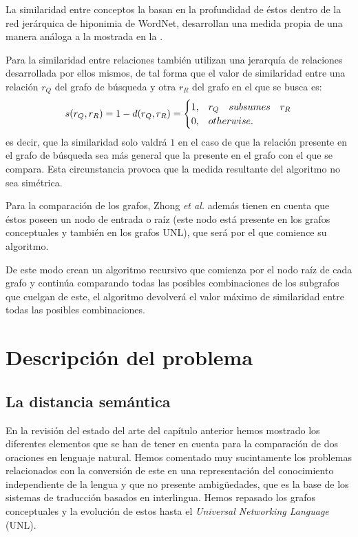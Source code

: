\documentclass[a4paper,12pt,spanish]{book}
\begin{document}
La similaridad entre conceptos la basan en la profundidad de éstos dentro de la red jerárquica
de hiponimia de WordNet, desarrollan una medida propia de una manera análoga a la mostrada en la
{\hyperref[1.state-of-the-art/ii.medidas-distancia:redes-conceptos-estructura]{\emph{}}}.

Para la similaridad entre relaciones también utilizan una jerarquía de relaciones desarrollada
por ellos mismos, de tal forma que el valor de similaridad entre una relación \(r_Q\) del
grafo de búsqueda y otra \(r_R\) del grafo en el que se busca es:
\begin{gather}
\begin{split}s(r_Q, r_R) = 1 - d(r_Q, r_R) = \begin{cases}
1, & r_Q \quad subsumes \quad r_R\\
0, & otherwise.
\end{cases}\end{split}\notag
\end{gather}
es decir, que la similaridad solo valdrá \(1\) en el caso de que la relación presente en el
grafo de búsqueda sea más general que la presente en el grafo con el que se compara. Esta
circunstancia provoca que la medida resultante del algoritmo no sea simétrica.

Para la comparación de los grafos, Zhong \emph{et al.} además tienen en cuenta que éstos poseen un
nodo de entrada o raíz (este nodo está presente en los grafos conceptuales y también en
los grafos UNL), que será por el que comience su algoritmo.

De este modo crean un algoritmo recursivo que comienza por el nodo raíz de cada grafo y
continúa comparando todas las posibles combinaciones de los subgrafos que cuelgan de este, el
algoritmo devolverá el valor máximo de similaridad entre todas las posibles combinaciones.
\newpage

\chapter{Descripción del problema}
\label{2.problem/index:descripcion-del-problema}\label{2.problem/index::doc}

\section{La distancia semántica}
\label{2.problem/index:la-distancia-semantica}
En la revisión del estado del arte del capítulo anterior hemos mostrado los diferentes
elementos que se han de tener en cuenta para la comparación de dos oraciones en lenguaje
natural. Hemos comentado muy sucintamente los problemas relacionados con la conversión de
este en una representación del conocimiento independiente de la lengua y que
no presente ambigüedades, que es la base de los sistemas de traducción basados en
interlingua. Hemos repasado los grafos conceptuales y la evolución de estos hasta el
\emph{Universal Networking Language} (UNL).
\end{document}
